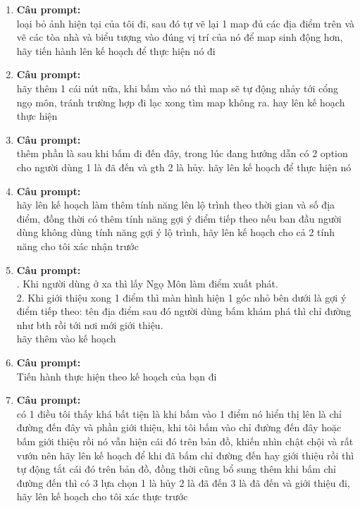 \begin{enumerate}
\item \textbf{Câu prompt:} \\
\* loại bỏ ảnh hiện tại của tôi đi, sau đó tự vẽ lại 1 map đủ các địa điểm trên và vẽ các tòa nhà và biểu tượng vào đúng vị trí của nó để map sinh động hơn, hãy tiến hành lên kế hoạch để thực hiện nó đi \\



\item \textbf{Câu prompt:} \\
\* hãy thêm 1 cái nút nữa, khi bấm vào nó thì map sẽ tự động nhảy tới cổng ngọ môn, tránh trường hợp đi lạc xong tìm map không ra. hay lên kế hoạch thực hiện \\



\item \textbf{Câu prompt:} \\
\* thêm phần là sau khi bấm đi đến đây, trong lúc đang hướng dẫn có 2 option cho người dùng 1 là đã đến và gth 2 là hủy. hãy lên kế hoạch để thực hiện nó \\



\item \textbf{Câu prompt:} \\
\* hãy lên kế hoạch làm thêm tính năng lên lộ trình theo thời gian và số địa điểm, đồng thời có thêm tính năng gợi ý điểm tiếp theo nếu ban đầu người dùng không dùng tính năng gợi ý lộ trình, hãy lên kế hoạch cho cả 2 tính năng cho tôi xác nhận trước \\



\item \textbf{Câu prompt:} \\
. Khi người dùng ở xa thì lấy Ngọ Môn làm điểm xuất phát. \\
    	2. Khi giới thiệu xong 1 điểm thì màn hình hiện 1 góc nhỏ bên dưới là gợi ý điểm tiếp theo: tên địa điểm sau đó người dùng bấm khám phá thì chỉ đường như bth rồi tới nơi mới giới thiệu. \\

hãy thêm vào kế hoạch \\


\item \textbf{Câu prompt:} \\
\* Tiến hành thực hiện theo kế hoạch của bạn đi \\



\item \textbf{Câu prompt:} \\
\* có 1 điều tôi thấy khá bất tiện là khi bấm vào 1 điểm nó hiển thị lên là chỉ đường đến đây và phần giới thiệu, khi tôi bấm vào chỉ đường đến đây hoặc bấm giới thiệu rồi nó vẫn hiện cái đó trên bản đồ, khiến nhìn chật chội và rất vướn nên hãy lên kế hoạch để khi đã bấm chỉ đường đến hay giới thiệu rồi thì tự động tắt cái đó trên bản đồ, đồng thời cũng bổ sung thêm khi bấm chỉ đường đến thì có 3 lựa chọn 1 là hủy 2 là đã đến 3 là đã đến và giới thiệu đi, hãy lên kế hoạch cho tôi xác thực trước \\




\end{enumerate}
